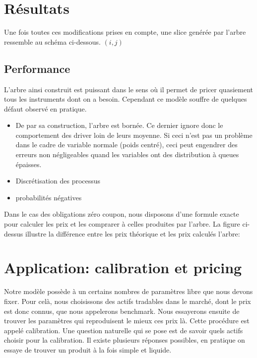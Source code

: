 

\chapter{Résultats}

Une fois toutes ces modifications prises en compte, une slice genérée par l'arbre ressemble au schéma ci-dessous. $(i, j)$ 



\section*{Performance}
L'arbre ainsi construit est puissant dans le sens où il permet de pricer quasiement tous les instruments dont on a besoin. Cependant ce modèle souffre de quelques défaut observé en pratique.

\begin{itemize}
\item  De par sa construction, l'arbre est bornée. Ce dernier ignore donc le comportement des driver loin de leurs moyenne. Si ceci n'est pas un problème dans le cadre de variable normale (poids centré), ceci peut engendrer des erreurs non négligeables quand les variables ont des distribution à queues épaisses.
\item  Discrétisation des processus
\item  probabilités négatives
\end{itemize}

Dans le cas des obligations zéro coupon, nous disposons d'une formule exacte pour calculer les prix et les comprarer à celles produites par l'arbre. 
La figure ci-dessus illustre la différence entre les prix théorique et les prix calculés l'arbre:


\chapter{Application: calibration et pricing}
Notre modèle possède à un certains nombres de paramètres libre que nous devons fixer. Pour celà, nous choisissons des actifs tradables dans le marché, dont le prix est donc connus, que nous appelerons benchmark. Nous essayerons ensuite de trouver les paramètres qui reproduisent le mieux ces prix là. Cette procédure est appelé calibration.
Une question naturelle qui se pose est de savoir quels actifs choisir pour la calibration. Il existe plusieurs réponses possibles, en pratique on essaye de trouver un produit à la fois simple et liquide.

